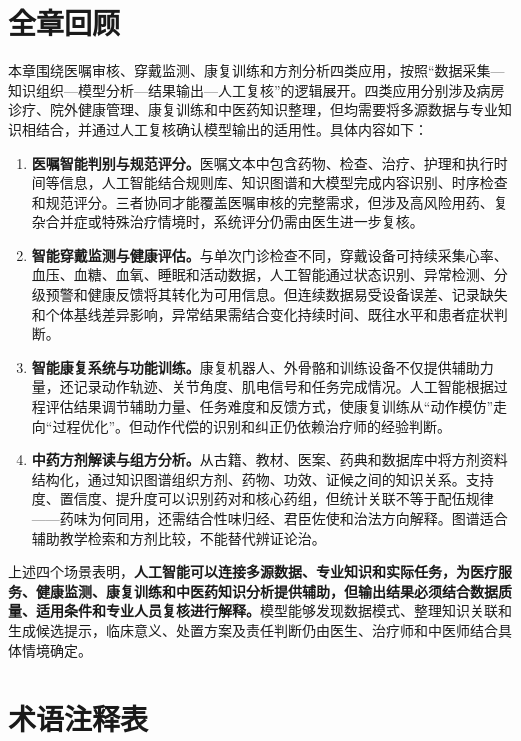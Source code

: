\clearpage
\section*{全章回顾}

本章围绕医嘱审核、穿戴监测、康复训练和方剂分析四类应用，按照“数据采集—知识组织—模型分析—结果输出—人工复核”的逻辑展开。四类应用分别涉及病房诊疗、院外健康管理、康复训练和中医药知识整理，但均需要将多源数据与专业知识相结合，并通过人工复核确认模型输出的适用性。具体内容如下：

\begin{enumerate}
\def\labelenumi{\arabic{enumi}.}
\setlength{\itemsep}{3pt}
\item \textbf{医嘱智能判别与规范评分。}医嘱文本中包含药物、检查、治疗、护理和执行时间等信息，人工智能结合规则库、知识图谱和大模型完成内容识别、时序检查和规范评分。三者协同才能覆盖医嘱审核的完整需求，但涉及高风险用药、复杂合并症或特殊治疗情境时，系统评分仍需由医生进一步复核。
\item \textbf{智能穿戴监测与健康评估。}与单次门诊检查不同，穿戴设备可持续采集心率、血压、血糖、血氧、睡眠和活动数据，人工智能通过状态识别、异常检测、分级预警和健康反馈将其转化为可用信息。但连续数据易受设备误差、记录缺失和个体基线差异影响，异常结果需结合变化持续时间、既往水平和患者症状判断。
\item \textbf{智能康复系统与功能训练。}康复机器人、外骨骼和训练设备不仅提供辅助力量，还记录动作轨迹、关节角度、肌电信号和任务完成情况。人工智能根据过程评估结果调节辅助力量、任务难度和反馈方式，使康复训练从``动作模仿''走向``过程优化''。但动作代偿的识别和纠正仍依赖治疗师的经验判断。
\item \textbf{中药方剂解读与组方分析。}从古籍、教材、医案、药典和数据库中将方剂资料结构化，通过知识图谱组织方剂、药物、功效、证候之间的知识关系。支持度、置信度、提升度可以识别药对和核心药组，但统计关联不等于配伍规律——药味为何同用，还需结合性味归经、君臣佐使和治法方向解释。图谱适合辅助教学检索和方剂比较，不能替代辨证论治。
\end{enumerate}

上述四个场景表明，\textbf{人工智能可以连接多源数据、专业知识和实际任务，为医疗服务、健康监测、康复训练和中医药知识分析提供辅助，但输出结果必须结合数据质量、适用条件和专业人员复核进行解释。}模型能够发现数据模式、整理知识关联和生成候选提示，临床意义、处置方案及责任判断仍由医生、治疗师和中医师结合具体情境确定。

\clearpage
\section*{术语注释表}

